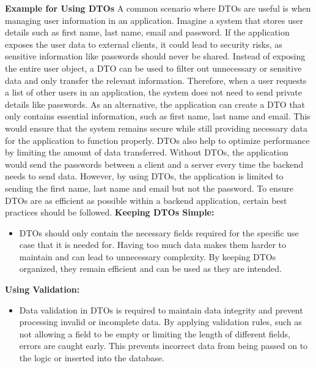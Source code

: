     \textbf{Example for Using DTOs} \newline
    A common scenario where DTOs are useful is when managing user information in an application. \newline
    Imagine a system that stores user details such as first name, last name, email and password. If the application exposes the user data to external clients, it could lead to security risks, as sensitive information like passwords should never be shared. Instead of exposing the entire user object, a DTO can be used to filter out unnecessary or sensitive data and only transfer the relevant information. \newline
    Therefore, when a user requests a list of other users in an application, the system does not need to send private details like passwords. As an alternative, the application can create a DTO that only contains essential information, such as first name, last name and email. This would ensure that the system remains secure while still providing necessary data for the application to function properly. \newline
    DTOs also help to optimize performance by limiting the amount of data transferred. Without DTOs, the application would send the passwords between a client and a server every time the backend needs to send data. However, by using DTOs, the application is limited to sending the first name, last name and email but not the password. \newline 
    To ensure DTOs are as efficient as possible within a backend application, certain best practices should be followed. \newline 
    \textbf{Keeping DTOs Simple:}
        \begin{itemize}
            \item DTOs should only contain the necessary fields required for the specific use case that it is needed for. Having too much data makes them harder to maintain and can lead to unnecessary complexity. By keeping DTOs organized, they remain efficient and can be used as they are intended.
        \end{itemize}
    \textbf{Using Validation:}
        \begin{itemize}
            \item Data validation in DTOs is required to maintain data integrity and prevent processing invalid or incomplete data. By applying validation rules, such as not allowing a field to be empty or limiting the length of different fields, errors are caught early. This prevents incorrect data from being passed on to the logic or inserted into the database. \newpage
        \end{itemize}
